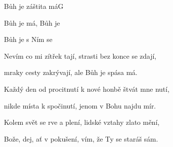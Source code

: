 \setcounter{page}{105}
\begin{song}{Bůh je záštita má}{G}{}

\begin{SBChorus}

Bůh je  má, Bůh je   

Bůh je   s Ním  se 

\end{SBChorus}

\begin{SBVerse}

Nevím co mi zítřek tají, strasti bez konce se zdají,

mraky cesty zakrývají, ale Bůh je spása má.

\end{SBVerse}

\begin{SBVerse}
Každý den od procitnutí k nové honbě štvát mne nutí,

nikde místa k spočinutí, jenom v Bohu najdu mír.

\end{SBVerse}

\begin{SBVerse}

Kolem svět se rve a plení, lidské vztahy zlato mění,

Bože, dej, ať v pokušení, vím, že Ty se staráš sám.

\end{SBVerse}

\end{song}
